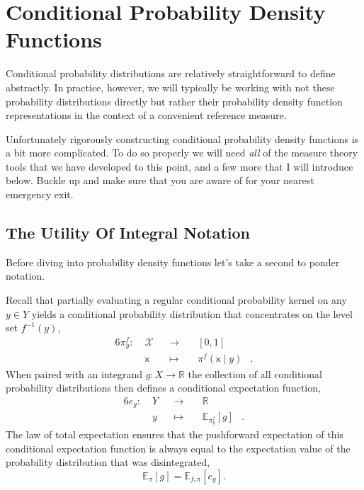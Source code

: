 \documentclass[
  letterpaper,
  DIV=11,
  numbers=noendperiod]{scrartcl}
\begin{document}
\section{Conditional Probability Density
Functions}\label{conditional-probability-density-functions}

Conditional probability distributions are relatively straightforward to
define abstractly. In practice, however, we will typically be working
with not these probability distributions directly but rather their
probability density function representations in the context of a
convenient reference measure.

Unfortunately rigorously constructing conditional probability density
functions is a bit more complicated. To do so properly we will need
\emph{all} of the measure theory tools that we have developed to this
point, and a few more that I will introduce below. Buckle up and make
sure that you are aware of for your nearest emergency exit.

\subsection{The Utility Of Integral
Notation}\label{the-utility-of-integral-notation}

Before diving into probability density functions let's take a second to
ponder notation.

Recall that partially evaluating a regular conditional probability
kernel on any \(y \in Y\) yields a conditional probability distribution
that concentrates on the level set \(f^{-1}(y)\), \begin{alignat*}{6}
\pi^{f}_{y} :\; &\mathcal{X}& &\rightarrow& \; &[0, 1]&
\\
&\mathsf{x}& &\mapsto& &\pi^{f}( \mathsf{x} \mid y )&.
\end{alignat*} When paired with an integrand
\(g : X \rightarrow \mathbb{R}\) the collection of all conditional
probability distributions then defines a conditional expectation
function, \begin{alignat*}{6}
e_{g} : \; &Y& &\rightarrow& \; &\mathbb{R}&
\\
&y& &\mapsto& & \mathbb{E}_{ \pi^{f}_{y} } \! \left[  g  \right]&.
\end{alignat*} The law of total expectation ensures that the pushforward
expectation of this conditional expectation function is always equal to
the expectation value of the probability distribution that was
disintegrated, \[
\mathbb{E}_{\pi} \! \left[ g \right] = \mathbb{E}_{ f_{*} \pi } \! \left[ e_{g} \right].
\]
\end{document}
